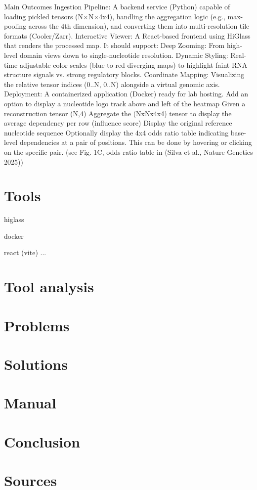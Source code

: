 \documentclass{article}
\begin{document}
Main Outcomes
Ingestion Pipeline: A backend service (Python) capable of loading pickled tensors (N×N×4x4), handling the aggregation logic (e.g., max-pooling across the 4th dimension), and converting them into multi-resolution tile formats (Cooler/Zarr).
Interactive Viewer: A React-based frontend using HiGlass that renders the processed map. 
It should support:
Deep Zooming: From high-level domain views down to single-nucleotide resolution.
Dynamic Styling: Real-time adjustable color scales (blue-to-red diverging maps) to highlight faint RNA structure signals vs. strong regulatory blocks.
Coordinate Mapping: Visualizing the relative tensor indices (0..N, 0..N) alongside a virtual genomic axis.
Deployment: A containerized application (Docker) ready for lab hosting.
Add an option to display a nucleotide logo track above and left of the heatmap
Given a reconstruction tensor (N,4)
Aggregate the (NxNx4x4) tensor to display the average dependency per row (influence score)
Display the original reference nucleotide sequence
Optionally display the 4x4 odds ratio table indicating base-level dependencies at a pair of positions. This can be done by hovering or clicking on the specific pair. (see Fig. 1C, odds ratio table in  (Silva et al., Nature Genetics 2025))



\section{Tools}
higlass

docker

react (vite)
...



\section{Tool analysis}

\section{Problems}

\section{Solutions}

\section{Manual}

\section{Conclusion}

\section{Sources}
\end{document}
